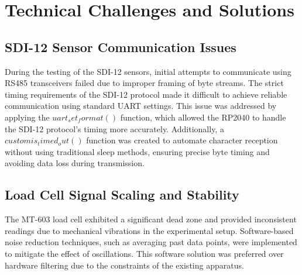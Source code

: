 \section{Technical Challenges and Solutions}

\subsection{SDI-12 Sensor Communication Issues}
During the testing of the SDI-12 sensors, initial attempts to communicate using RS485 transceivers failed due to improper framing of byte streams. The strict timing requirements of the SDI-12 protocol made it difficult to achieve reliable communication using standard UART settings. This issue was addressed by applying the $uart_set_format()$ function, which allowed the RP2040 to handle the SDI-12 protocol's timing more accurately. Additionally, a $custom is_timed_out()$ function was created to automate character reception without using traditional sleep methods, ensuring precise byte timing and avoiding data loss during transmission.

\subsection{Load Cell Signal Scaling and Stability}
The MT-603 load cell exhibited a significant dead zone and provided inconsistent readings due to mechanical vibrations in the experimental setup. Software-based noise reduction techniques, such as averaging past data points, were implemented to mitigate the effect of oscillations. This software solution was preferred over hardware filtering due to the constraints of the existing apparatus.